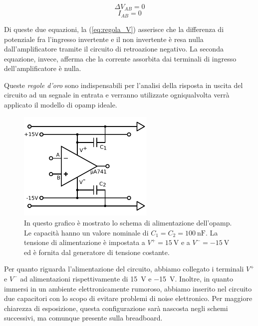 \begin{equation}
\Delta V_{AB}=0
\label{eq:regola_V}
\end{equation}
\begin{equation}
I_{AB}=0
\label{eq:regola_I}
\end{equation}

Di queste due equazioni, la (\ref{eq:regola_V}) asserisce che la differenza di potenziale fra l'ingresso invertente e il non invertente è resa nulla dall'amplificatore tramite il circuito di retroazione negativo.
La seconda equazione, invece, afferma che la corrente assorbita dai terminali di ingresso dell'amplificatore è nulla.

Queste \textit{regole d'oro} sono indispensabili per l'analisi della risposta in uscita del circuito ad un segnale in entrata e verranno utilizzate ogniqualvolta verrà applicato il modello di opamp ideale.

\begin{figure}
 \centering
	\includegraphics[width=6.5cm]{../E01/latex/alimentazione.pdf}
	\caption{In questo grafico è mostrato lo schema di alimentazione dell'opamp. Le capacità hanno un valore nominale di $C_1=C_2= \SI{100}{\nano\farad}$. La tensione di alimentazione è impostata a $V^+ = \SI{15}{\volt}$ e a $V^- = \SI{-15}{\volt}$ ed è fornita dal generatore di tensione costante.\\
\newline\newline\newline}
 \label{gr:costante}
\end{figure}

Per quanto riguarda l'alimentazione del circuito, abbiamo collegato i terminali $V^+$ e $V^-$ ad alimentazioni rispettivamente di \SI{+15}{\volt} e \SI{-15}{\volt}. Inoltre, in quanto immersi in un ambiente elettronicamente rumoroso, abbiamo inserito nel circuito due capacitori con lo scopo di evitare problemi di noise elettronico.
Per maggiore chiarezza di esposizione, questa configurazione sarà nascosta negli schemi successivi, ma comunque presente sulla breadboard.

